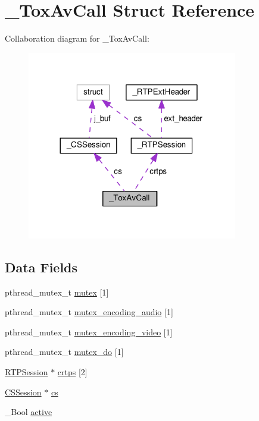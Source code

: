\hypertarget{struct___tox_av_call}{\section{\+\_\+\+Tox\+Av\+Call Struct Reference}
\label{struct___tox_av_call}
}


Collaboration diagram for \+\_\+\+Tox\+Av\+Call\+:
\nopagebreak
\begin{figure}[H]
\begin{center}
\leavevmode
\includegraphics[width=260pt]{d7/d2f/struct___tox_av_call__coll__graph}
\end{center}
\end{figure}
\subsection*{Data Fields}
\begin{DoxyCompactItemize}
\item 
pthread\+\_\+mutex\+\_\+t \hyperlink{struct___tox_av_call_ab4293016252c4d4e63549b0773fa0f33}{mutex} \mbox{[}1\mbox{]}
\item 
pthread\+\_\+mutex\+\_\+t \hyperlink{struct___tox_av_call_ac4c859b6e4ff8e175151fbd0a763e414}{mutex\+\_\+encoding\+\_\+audio} \mbox{[}1\mbox{]}
\item 
pthread\+\_\+mutex\+\_\+t \hyperlink{struct___tox_av_call_a89e9fe0c3fef08c502e53ad423dccc34}{mutex\+\_\+encoding\+\_\+video} \mbox{[}1\mbox{]}
\item 
pthread\+\_\+mutex\+\_\+t \hyperlink{struct___tox_av_call_acc4203df7776b6dfe0e5c3922a35e5b0}{mutex\+\_\+do} \mbox{[}1\mbox{]}
\item 
\hyperlink{rtp_8h_aecafd8fd6e485ceb09747d50703bcd06}{R\+T\+P\+Session} $\ast$ \hyperlink{struct___tox_av_call_a2e84bee4a1898deac1f63f47235378eb}{crtps} \mbox{[}2\mbox{]}
\item 
\hyperlink{codec_8h_afe3951fb4d95e129eb5b9de06e946b16}{C\+S\+Session} $\ast$ \hyperlink{struct___tox_av_call_ae88a02b5082b346e4c90541186364e99}{cs}
\item 
\+\_\+\+Bool \hyperlink{struct___tox_av_call_a215df53a125f9b848dc883d9a1164430}{active}
\end{DoxyCompactItemize}


